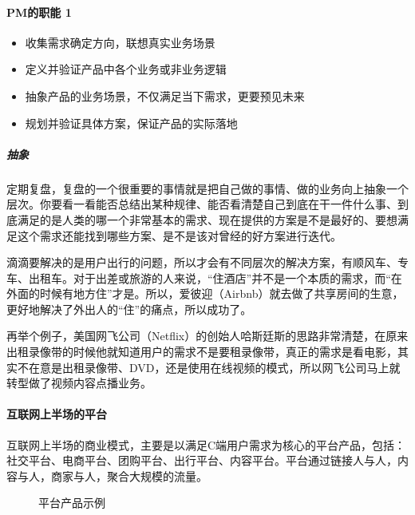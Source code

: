 \documentclass[letterpaper,11pt,english]{sphinxmanual}
\begin{document}
\paragraph{PM的职能 1\sphinxfootnotemark[98]}
\label{\detokenize{chapter_introduction/platform:pm-1}}%
\begin{footnotetext}[98]\sphinxAtStartFootnote
{}
%
\end{footnotetext}\ignorespaces \begin{itemize}
\item {} 
收集需求确定方向，联想真实业务场景

\item {} 
定义并验证产品中各个业务或非业务逻辑

\item {} 
抽象产品的业务场景，不仅满足当下需求，更要预见未来

\item {} 
规划并验证具体方案，保证产品的实际落地

\end{itemize}


\subparagraph{抽象}
\label{\detokenize{chapter_introduction/platform:id2}}
定期复盘，复盘的一个很重要的事情就是把自己做的事情、做的业务向上抽象一个层次。你要看一看能否总结出某种规律、能否看清楚自己到底在干一件什么事、到底满足的是人类的哪一个非常基本的需求、现在提供的方案是不是最好的、要想满足这个需求还能找到哪些方案、是不是该对曾经的好方案进行迭代。

滴滴要解决的是用户出行的问题，所以才会有不同层次的解决方案，有顺风车、专车、出租车。对于出差或旅游的人来说，“住酒店”并不是一个本质的需求，而“在外面的时候有地方住”才是。所以，爱彼迎（Airbnb）就去做了共享房间的生意，更好地解决了外出人的“住”的痛点，所以成功了。

再举个例子，美国网飞公司（Netflix）的创始人哈斯廷斯的思路非常清楚，在原来出租录像带的时候他就知道用户的需求不是要租录像带，真正的需求是看电影，其实不在意是出租录像带、DVD，还是使用在线视频的模式，所以网飞公司马上就转型做了视频内容点播业务。


\paragraph{互联网上半场的平台}
\label{\detokenize{chapter_introduction/platform:id3}}
互联网上半场的商业模式，主要是以满足C端用户需求为核心的平台产品，包括：社交平台、电商平台、团购平台、出行平台、内容平台。平台通过链接人与人，内容与人，商家与人，聚合大规模的流量。

\begin{figure}[H]
\centering
\capstart

\noindent{}
\caption{平台产品示例}\label{\detokenize{chapter_introduction/platform:id10}}\end{figure}
\end{document}

